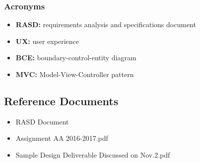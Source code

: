 \subsubsection{Acronyms}
\begin{itemize}
\item \textbf{RASD:} requirements analysis and specifications document
\item \textbf{UX:} user experience
\item \textbf{BCE:} boundary-control-entity diagram
\item \textbf{MVC:} Model-View-Controller pattern 
\end{itemize}

\subsection{Reference Documents}
\begin{itemize}
\item RASD Document
\item Assignment AA 2016-2017.pdf
\item Sample Design Deliverable Discussed on Nov.2.pdf
\end{itemize}


